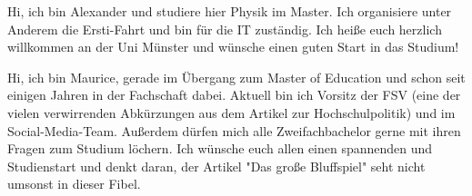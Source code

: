 \begin{multicols}{2}
\vspace{-0.85cm}

{
Hi, ich bin Alexander und studiere hier Physik im Master. Ich organisiere unter Anderem die Ersti-Fahrt und bin für die IT zuständig. 
Ich heiße euch herzlich willkommen an der Uni Münster und wünsche einen guten Start in das Studium!
}

\vspace{-1.55cm}

{
Hi, ich bin Maurice, gerade im Übergang zum Master of Education und schon seit einigen Jahren in der Fachschaft dabei. Aktuell bin ich Vorsitz der FSV (eine der vielen verwirrenden Abkürzungen aus dem Artikel zur Hochschulpolitik) und im Social-Media-Team. Außerdem dürfen mich alle Zweifachbachelor gerne mit ihren Fragen zum Studium löchern. Ich wünsche euch allen einen spannenden und Studienstart und denkt daran, der Artikel "Das große Bluffspiel" seht nicht umsonst in dieser Fibel.
}


\end{multicols}
